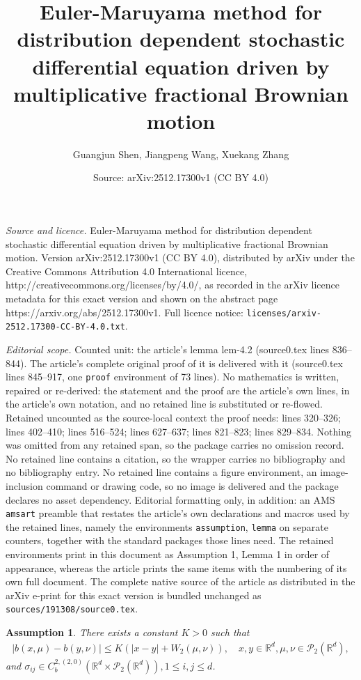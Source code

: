 \documentclass[10pt,a4paper]{amsart}
\title{Euler-Maruyama method for distribution dependent stochastic differential equation driven by multiplicative fractional Brownian motion}
\author{Guangjun Shen, Jiangpeng Wang, Xuekang Zhang}
\date{Source: arXiv:2512.17300v1 (CC BY 4.0)}
\newtheorem{assumption}{Assumption}
\def\R{\mathbb R}
\def\pb{\mathscr{P}}
\begin{document}
\maketitle

\noindent\emph{Source and licence.} Euler-Maruyama method for distribution dependent stochastic differential equation driven by multiplicative fractional Brownian motion. Version arXiv:2512.17300v1 (CC BY 4.0), distributed by arXiv under the Creative Commons Attribution 4.0 International licence, http://creativecommons.org/licenses/by/4.0/, as recorded in the arXiv licence metadata for this exact version and shown on the abstract page https://arxiv.org/abs/2512.17300v1. Full licence notice: \texttt{licenses/arxiv-2512.17300-CC-BY-4.0.txt}.\par\smallskip

\noindent\textit{Editorial scope.} Counted unit: the article's lemma lem-4.2 (source0.tex lines 836--844). The article's complete original proof of it is delivered with it (source0.tex lines 845--917, one \texttt{proof} environment of 73 lines). No mathematics is written, repaired or re-derived: the statement and the proof are the article's own lines, in the article's own notation, and no retained line is substituted or re-flowed.  Retained uncounted as the source-local context the proof needs: lines 320--326; lines 402--410; lines 516--524; lines 627--637; lines 821--823; lines 829--834.  Nothing was omitted from any retained span, so the package carries no omission record.  No retained line contains a citation, so the wrapper carries no bibliography and no bibliography entry.  No retained line contains a figure environment, an image-inclusion command or drawing code, so no image is delivered and the package declares no asset dependency.  Editorial formatting only, in addition: an AMS \texttt{amsart} preamble that restates the article's own declarations and macros used by the retained lines, namely the environments \texttt{assumption}, \texttt{lemma} on separate counters, together with the standard packages those lines need.  The retained environments print in this document as Assumption 1, Lemma 1 in order of appearance, whereas the article prints the same items with the numbering of its own full document.  The complete native source of the article as distributed in the arXiv e-print for this exact version is bundled unchanged as \texttt{sources/191308/source0.tex}.
	\begin{assumption}\label{ass-2.3}
		There exists a constant $K > 0$ such that
		\begin{align*}
			|b(x,\mu)-b(y,\nu)|\leq K(|x-y|+W_2(\mu,\nu)),\quad x,y\in \R^d, \mu,\nu\in\pb_2(\R^d),
		\end{align*}
		and $\sigma_{ij}\in C_b^{2,(2,0)}(\R^d\times\pb_2(\R^d)),1\leq i,j \leq d$.
	\end{assumption}
\end{document}
